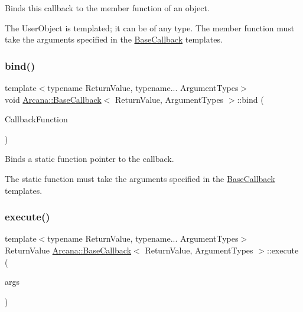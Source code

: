 Binds this callback to the member function of an object. 

The User\+Object is templated; it can be of any type. The member function must take the arguments specified in the \mbox{\hyperlink{class_arcana_1_1_base_callback}{Base\+Callback}} templates. \mbox{\label{class_arcana_1_1_base_callback_abceb1a28ee038b2aec2335e672f71559}} 
\subsubsection{\texorpdfstring{bind()}{bind()}\hspace{0.1cm}{\footnotesize\ttfamily [2/2]}}
{\footnotesize\ttfamily template$<$typename Return\+Value, typename... Argument\+Types$>$ \\
void \mbox{\hyperlink{class_arcana_1_1_base_callback}{Arcana\+::\+Base\+Callback}}$<$ Return\+Value, Argument\+Types $>$\+::bind (\begin{DoxyParamCaption}\item[{Return\+Value($\ast$)(Argument\+Types...)}]{Callback\+Function }\end{DoxyParamCaption})\hspace{0.3cm}{\ttfamily [inline]}}



Binds a static function pointer to the callback. 

The static function must take the arguments specified in the \mbox{\hyperlink{class_arcana_1_1_base_callback}{Base\+Callback}} templates. \mbox{\label{class_arcana_1_1_base_callback_ab9cba864f0037c3125ff1b5ea7a33a08}} 
\subsubsection{\texorpdfstring{execute()}{execute()}}
{\footnotesize\ttfamily template$<$typename Return\+Value, typename... Argument\+Types$>$ \\
Return\+Value \mbox{\hyperlink{class_arcana_1_1_base_callback}{Arcana\+::\+Base\+Callback}}$<$ Return\+Value, Argument\+Types $>$\+::execute (\begin{DoxyParamCaption}\item[{Argument\+Types...}]{args }\end{DoxyParamCaption})\hspace{0.3cm}{\ttfamily [inline]}}



